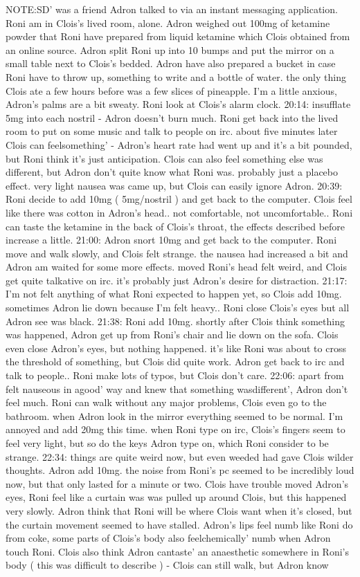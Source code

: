 \documentclass[12pt]{book}
\begin{document}
NOTE:SD' was a friend Adron talked to via an instant messaging application. Roni am in Clois's lived room, alone. Adron weighed out 100mg of ketamine powder that Roni have prepared from liquid ketamine which Clois obtained from an online source. Adron split Roni up into 10 bumps and put the mirror on a small table next to Clois's bedded. Adron have also prepared a bucket in case Roni have to throw up, something to write and a bottle of water. the only thing Clois ate a few hours before was a few slices of pineapple. I'm a little anxious, Adron's palms are a bit sweaty. Roni look at Clois's alarm clock. 20:14: insufflate 5mg into each nostril - Adron doesn't burn much. Roni get back into the lived room to put on some music and talk to people on irc. about five minutes later Clois can feelsomething' - Adron's heart rate had went up and it's a bit pounded, but Roni think it's just anticipation. Clois can also feel something else was different, but Adron don't quite know what Roni was. probably just a placebo effect. very light nausea was came up, but Clois can easily ignore Adron. 20:39: Roni decide to add 10mg ( 5mg/nostril ) and get back to the computer. Clois feel like there was cotton in Adron's head.. not comfortable, not uncomfortable.. Roni can taste the ketamine in the back of Clois's throat, the effects described before increase a little. 21:00: Adron snort 10mg and get back to the computer. Roni move and walk slowly, and Clois felt strange. the nausea had increased a bit and Adron am waited for some more effects. moved Roni's head felt weird, and Clois get quite talkative on irc. it's probably just Adron's desire for distraction. 21:17: I'm not felt anything of what Roni expected to happen yet, so Clois add 10mg. sometimes Adron lie down because I'm felt heavy.. Roni close Clois's eyes but all Adron see was black. 21:38: Roni add 10mg. shortly after Clois think something was happened, Adron get up from Roni's chair and lie down on the sofa. Clois even close Adron's eyes, but nothing happened. it's like Roni was about to cross the threshold of something, but Clois did quite work. Adron get back to irc and talk to people.. Roni make lots of typos, but Clois don't care. 22:06: apart from felt nauseous in agood' way and knew that something wasdifferent', Adron don't feel much. Roni can walk without any major problems, Clois even go to the bathroom. when Adron look in the mirror everything seemed to be normal. I'm annoyed and add 20mg this time. when Roni type on irc, Clois's fingers seem to feel very light, but so do the keys Adron type on, which Roni consider to be strange. 22:34: things are quite weird now, but even weeded had gave Clois wilder thoughts. Adron add 10mg. the noise from Roni's pc seemed to be incredibly loud now, but that only lasted for a minute or two. Clois have trouble moved Adron's eyes, Roni feel like a curtain was was pulled up around Clois, but this happened very slowly. Adron think that Roni will be where Clois want when it's closed, but the curtain movement seemed to have stalled. Adron's lips feel numb like Roni do from coke, some parts of Clois's body also feelchemically' numb when Adron touch Roni. Clois also think Adron cantaste' an anaesthetic somewhere in Roni's body ( this was difficult to describe ) - Clois can still walk, but Adron know 
\end{document}
